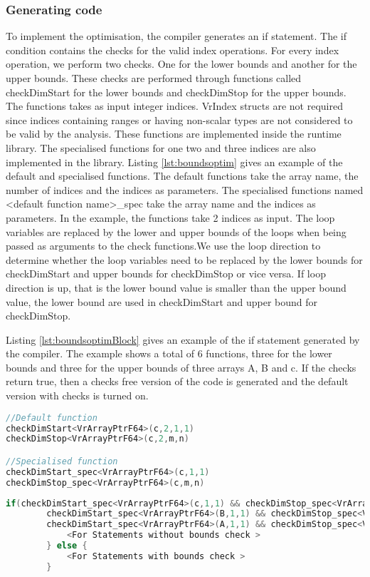 \subsubsection{Generating code}
To implement the optimisation, the compiler generates an if statement. The if condition contains the checks for the valid index operations. For every index operation, we perform two checks. One for the lower bounds and another for the upper bounds. These checks are performed through functions called checkDimStart for the lower bounds and checkDimStop for the upper bounds. The functions takes as input integer indices. VrIndex structs are not required since indices containing ranges or having non-scalar types are not considered to be valid by the analysis. These functions are implemented inside the runtime library. The specialised functions for one two and three indices are also implemented in the library. Listing \ref{lst:boundsoptim} gives an example of the default and specialised functions. The default functions take the array name, the number of indices and the indices as parameters. The specialised functions named <default function name>\_spec take the array name and the indices as parameters. In the example, the functions take 2 indices as input. The loop variables are replaced by the lower and upper bounds of the loops when being passed as arguments to the check functions.We use the loop direction to determine whether the loop variables need to be replaced by the lower bounds for checkDimStart and upper bounds for checkDimStop or vice versa. If loop direction is up, that is the lower bound value is smaller than the upper bound value, the lower bound are used in checkDimStart and upper bound for checkDimStop. 

Listing \ref{lst:boundsoptimBlock} gives an example of the if statement generated by the compiler. The example shows a total of 6 functions, three for the lower bounds and three for the upper bounds of three arrays A, B and c. If the checks return true, then a checks free version of the code is generated and the default version with checks is turned on. 
\begin{lstlisting}[float,language=c,caption={An example of the default and specialised function calls for the boundscheck optimisations},label={lst:boundsoptim}]
//Default function
checkDimStart<VrArrayPtrF64>(c,2,1,1)
checkDimStop<VrArrayPtrF64>(c,2,m,n)

//Specialised function
checkDimStart_spec<VrArrayPtrF64>(c,1,1)
checkDimStop_spec<VrArrayPtrF64>(c,m,n)
\end{lstlisting}
\begin{lstlisting}[float,language=c,caption={An example of the if statement generated for the boundscheck optimisations},label={lst:boundsoptimBlock}]
 if(checkDimStart_spec<VrArrayPtrF64>(c,1,1) && checkDimStop_spec<VrArrayPtrF64>(c,m,n) && 
		checkDimStart_spec<VrArrayPtrF64>(B,1,1) && checkDimStop_spec<VrArrayPtrF64>(B,k,n) && 
		checkDimStart_spec<VrArrayPtrF64>(A,1,1) && checkDimStop_spec<VrArrayPtrF64>(A,m,k)) {
			<For Statements without bounds check >	
		} else {
			<For Statements with bounds check >	
		}
	
\end{lstlisting}
